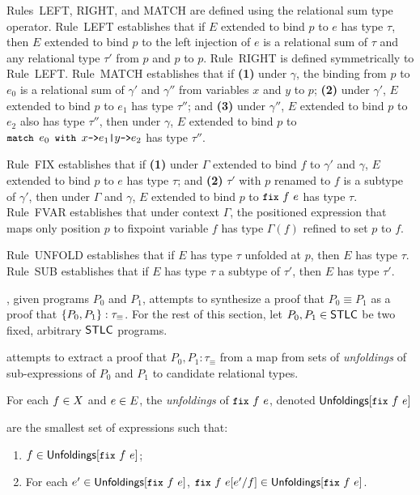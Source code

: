 Rules~LEFT, RIGHT, and MATCH are defined using the relational sum type
operator.
Rule~LEFT establishes that if $E$ extended to bind $p$ to $e$ has type
$\tau$, then $E$ extended to bind $p$ to the left injection of $e$ is
a relational sum of $\tau$ and any relational type $\tau'$ from $p$
and $p$ to $p$.
%
Rule~RIGHT is defined symmetrically to Rule~LEFT.
Rule~MATCH establishes that if %
\textbf{(1)} under $\gamma$, the binding from $p$ to $e_0$ is a
relational sum of $\gamma'$ and $\gamma''$ from variables $x$ and $y$
to $p$;
% 
\textbf{(2)} under $\gamma'$, $E$ extended to bind $p$ to $e_1$ has
type $\tau''$; and
%
\textbf{(3)} under $\gamma''$, $E$ extended to bind $p$ to $e_2$ also
has type $\tau''$, then under $\gamma$, $E$ extended to bind $p$ to
$\matchexp{e_0}{x}{e_1}{y}{e_2}$ has type $\tau''$.

Rule~FIX establishes that if %
\textbf{(1)} under $\Gamma$ extended to bind $f$ to $\gamma'$ and
$\gamma$, $E$ extended to bind $p$ to $e$ has type $\tau$; and %
\textbf{(2)} $\tau'$ with $p$ renamed to $f$ is a subtype of
$\gamma'$, then under $\Gamma$ and $\gamma$, $E$ extended to bind $p$
to $\fix{f}{e}$ has type $\tau$.
Rule~FVAR establishes that under context $\Gamma$, the positioned
expression that maps only position $p$ to fixpoint variable $f$ has
type $\Gamma(f)$ refined to set $p$ to $f$.

Rule~UNFOLD establishes that if $E$ has type $\tau$ unfolded at $p$,
then $E$ has type $\tau$.
Rule~SUB establishes that if $E$ has type $\tau$ a subtype of $\tau'$,
then $E$ has type $\tau'$.


% 
\sys, given programs $P_0$ and $P_1$, attempts to synthesize a proof
that $P_0 \equiv P_1$ as a proof that $\{  P_0, P_1  \} :
\tau_{\equiv}$.
%
For the rest of this section, let $P_0, P_1 \in \mathsf{STLC}$ be two fixed,
arbitrary $\mathsf{STLC}$ programs.

\sys attempts to extract a proof that $P_0, P_1 : \tau_{\equiv}$ from
a map from sets of \emph{unfoldings} of sub-expressions of $P_0$
and $P_1$ to candidate relational types.
%
\begin{defn}
  \label{defn:unfoldings}
  For each $f \in X$ and $e \in E$, the \emph{unfoldings} of
  $\fix{f}{e}$, denoted $\unfoldings{ \fix{f}{e} }$

 are the smallest set of expressions such that:
  \begin{enumerate}
  \item $f \in \unfoldings{ \fix{f}{e} }$;
  \item For each $e' \in \unfoldings{ \fix{f}{e} }$, $\replace{
      \fix{f}{e} }{ f }{ e' } \in \unfoldings{ \fix{f}{e} }$.
  \end{enumerate}
\end{defn}
%
%

